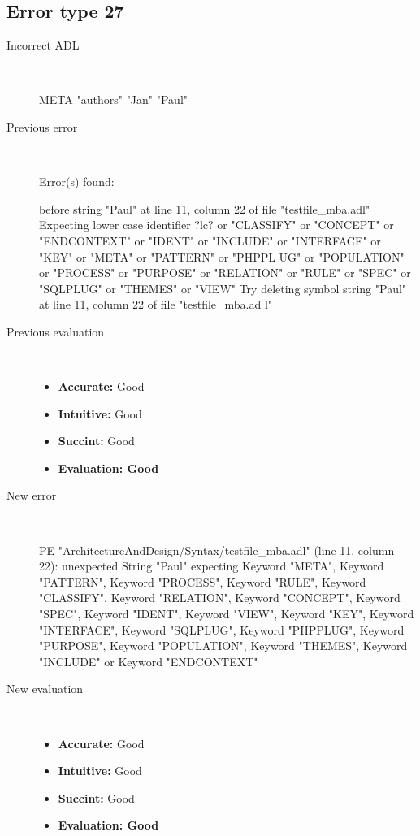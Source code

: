 \hrulefill

\subsection{Error type 27}
  \begin{description}
  \item[Incorrect ADL]~\\
\begin{adl}
META "authors" "Jan" "Paul"\end{adl}
  \item[Previous error]~\\
\begin{haskell}
Error(s) found:

before string "Paul" at line 11, column 22 of file "testfile_mba.adl"
Expecting lower case identifier ?lc? or "CLASSIFY" or "CONCEPT" or "ENDCONTEXT"
or "IDENT" or "INCLUDE" or "INTERFACE" or "KEY" or "META" or "PATTERN" or "PHPPL
UG" or "POPULATION" or "PROCESS" or "PURPOSE" or "RELATION" or "RULE" or "SPEC"
or "SQLPLUG" or "THEMES" or "VIEW"
Try deleting symbol string "Paul" at line 11, column 22 of file "testfile_mba.ad
l"

\end{haskell}
  \item[Previous evaluation]~\\
    \begin{itemize}
    \item \textbf{Accurate:} Good
    \item \textbf{Intuitive:} Good
    \item \textbf{Succint:} Good
    \item \textbf{Evaluation: Good}
    \end{itemize}
  \item[New error]~\\
\begin{haskell}
PE "ArchitectureAndDesign/Syntax/testfile_mba.adl" (line 11, column 22):
unexpected String "Paul"
expecting Keyword "META", Keyword "PATTERN", Keyword "PROCESS", Keyword "RULE", Keyword "CLASSIFY", Keyword "RELATION", Keyword "CONCEPT", Keyword "SPEC", Keyword "IDENT", Keyword "VIEW", Keyword "KEY", Keyword "INTERFACE", Keyword "SQLPLUG", Keyword "PHPPLUG", Keyword "PURPOSE", Keyword "POPULATION", Keyword "THEMES", Keyword "INCLUDE" or Keyword "ENDCONTEXT"
\end{haskell}
  \item[New evaluation]~\\
    \begin{itemize}
    \item \textbf{Accurate:} Good
    \item \textbf{Intuitive:} Good
    \item \textbf{Succint:} Good
    \item \textbf{Evaluation: Good
}
    \end{itemize}
  \end{description}

